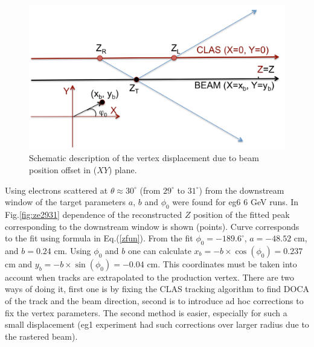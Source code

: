 \documentclass[12pt]{article}
\begin{document}
\begin{figure}[htb]
\begin{center}
\includegraphics[width=.67\textwidth]{vertex_displacement.pdf}
\caption{Schematic description of the vertex displacement due to beam position offset in ($XY$) plane.}
\label{fig:phid}
\end{center}
\end{figure}

Using electrons scattered at $\theta\approx30^\circ$ (from $29^\circ$ to $31^\circ$) from the downstream window of the target parameters $a$, $b$ and $\phi_0$ were found for eg6 $6$ GeV runs. In Fig.\ref{fig:ze2931} dependence of the reconstructed $Z$ position of the fitted peak corresponding to the downstream window is shown (points). Curve corresponds to the fit using formula in Eq.(\ref{zfun}). From the fit $\phi_0=-189.6^\circ$, $a=-48.52$ cm, and $b=0.24$ cm. Using $\phi_0$ and $b$ one can calculate $x_b=-b\times \cos(\phi_0)=0.237$ cm and $y_b=-b\times\sin(\phi_0)=-0.04$ cm.  This coordinates must be taken into account when tracks are extrapolated to the production vertex. There are two ways of doing it, first one is by fixing the CLAS tracking algorithm to find DOCA of the track and the beam direction, second is to introduce ad hoc corrections to fix the vertex parameters. The second method is easier, especially for such a small displacement (eg1 experiment had such corrections over larger radius due to the rastered beam).  
\end{document}
